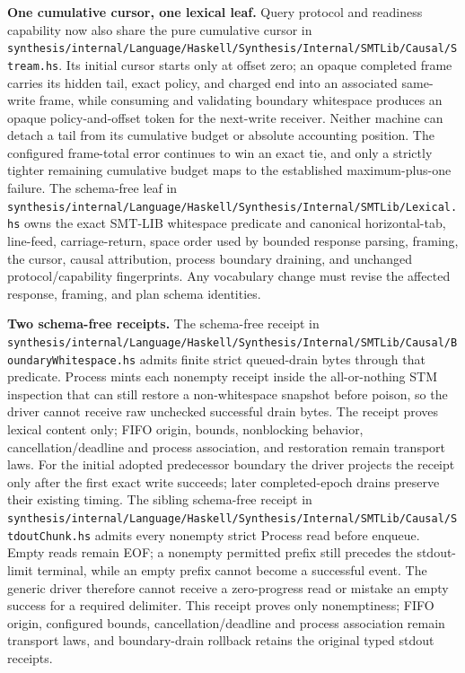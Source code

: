 \documentclass[10pt,letterpaper,oneside]{report}
\newcommand{\filepath}[1]{\nolinkurl{#1}}
\begin{document}
\begin{enumerate}
  \textbf{One cumulative cursor, one lexical leaf.} Query protocol and readiness capability now also share the pure cumulative cursor in \filepath{synthesis/internal/Language/Haskell/Synthesis/Internal/SMTLib/Causal/Stream.hs}. Its initial cursor starts only at offset zero; an opaque completed frame carries its hidden tail, exact policy, and charged end into an associated same-write frame, while consuming and validating boundary whitespace produces an opaque policy-and-offset token for the next-write receiver. Neither machine can detach a tail from its cumulative budget or absolute accounting position. The configured frame-total error continues to win an exact tie, and only a strictly tighter remaining cumulative budget maps to the established maximum-plus-one failure. The schema-free leaf in \filepath{synthesis/internal/Language/Haskell/Synthesis/Internal/SMTLib/Lexical.hs} owns the exact SMT-LIB whitespace predicate and canonical horizontal-tab, line-feed, carriage-return, space order used by bounded response parsing, framing, the cursor, causal attribution, process boundary draining, and unchanged protocol/capability fingerprints. Any vocabulary change must revise the affected response, framing, and plan schema identities.

  \textbf{Two schema-free receipts.} The schema-free receipt in \filepath{synthesis/internal/Language/Haskell/Synthesis/Internal/SMTLib/Causal/BoundaryWhitespace.hs} admits finite strict queued-drain bytes through that predicate. Process mints each nonempty receipt inside the all-or-nothing STM inspection that can still restore a non-whitespace snapshot before poison, so the driver cannot receive raw unchecked successful drain bytes. The receipt proves lexical content only; FIFO origin, bounds, nonblocking behavior, cancellation/deadline and process association, and restoration remain transport laws. For the initial adopted predecessor boundary the driver projects the receipt only after the first exact write succeeds; later completed-epoch drains preserve their existing timing. The sibling schema-free receipt in \filepath{synthesis/internal/Language/Haskell/Synthesis/Internal/SMTLib/Causal/StdoutChunk.hs} admits every nonempty strict Process read before enqueue. Empty reads remain EOF; a nonempty permitted prefix still precedes the stdout-limit terminal, while an empty prefix cannot become a successful event. The generic driver therefore cannot receive a zero-progress read or mistake an empty success for a required delimiter. This receipt proves only nonemptiness; FIFO origin, configured bounds, cancellation/deadline and process association remain transport laws, and boundary-drain rollback retains the original typed stdout receipts.


\end{enumerate}
\end{document}
